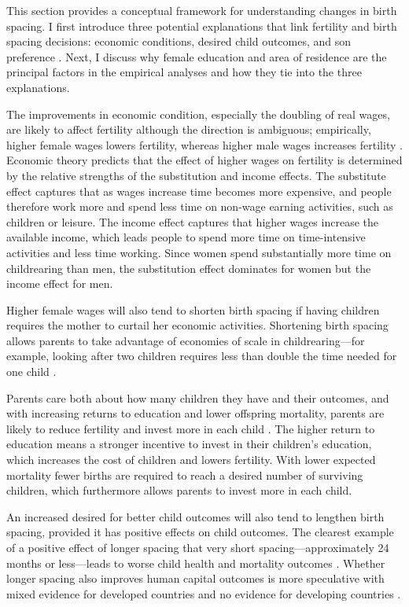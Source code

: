 This section provides a conceptual framework for understanding changes in birth spacing.
I first introduce three potential explanations that link fertility and birth 
spacing decisions: economic conditions, desired child outcomes, and son preference 
\citep{Casterline2016,Portner2018}.
Next, I discuss why female education and area of residence are the principal factors 
in the empirical analyses and how they tie into the three explanations.

The improvements in economic condition, especially the doubling of real wages,
are likely to affect fertility although the direction is ambiguous; empirically, 
higher female wages lowers fertility, whereas higher male wages increases fertility 
\citep{Hotz1997,schultz97}.
Economic theory predicts that the effect of higher wages on fertility is determined by 
the relative strengths of the substitution and income effects.
The substitute effect captures that as wages increase time becomes more expensive, and
people therefore work more and spend less time on non-wage earning activities, such as 
children or leisure.
The income effect captures that higher wages increase the available income, which
leads people to spend more time on time-intensive activities and less time working.
Since women spend substantially more time on childrearing than men, the substitution effect 
dominates for women but the income effect for men.

Higher female wages will also tend to shorten birth spacing if having children requires 
the mother to curtail her economic activities.
Shortening birth spacing allows parents to take advantage of economies of scale in 
childrearing---for example, looking after two children requires less than double the time 
needed for one child \citep{Vijverberg1982,Hotz1997}.


Parents care both about how many children they have and their outcomes, and with 
increasing returns to education and lower offspring mortality, parents are likely to 
reduce fertility and invest more in each child \citep{Rosenzweig1982a,Wolpin1997}.
The higher return to education means a stronger incentive to invest in their children's
education, which increases the cost of children and lowers fertility. 
With lower expected mortality fewer births are required to reach a desired number 
of surviving children, which furthermore allows parents to invest more in each child.

An increased desired for better child outcomes will also tend to lengthen birth spacing,
provided it has positive effects on child outcomes.
The clearest example of a positive effect of longer spacing that very short 
spacing---approximately 24 months or less---leads to worse child health and mortality 
outcomes \citep{Whitworth2002,Conde-Agudelo2012}.
Whether longer spacing also improves human capital outcomes is more speculative with
mixed evidence for developed countries and no evidence for developing countries
\citep{Zajonc1976,Powell1993,Pettersson-Lidbom2009,Buckles2012,Barclay2017}.

